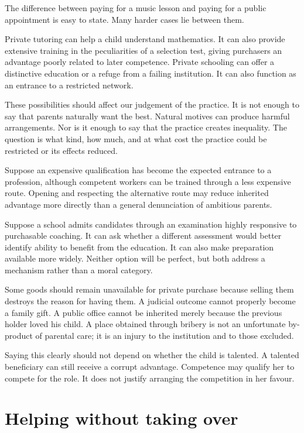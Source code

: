 \documentclass[12pt,a4paper]{book}
\begin{document}
The difference between paying for a music lesson and paying for a public appointment is easy to state. Many harder cases lie between them.

Private tutoring can help a child understand mathematics. It can also provide extensive training in the peculiarities of a selection test, giving purchasers an advantage poorly related to later competence. Private schooling can offer a distinctive education or a refuge from a failing institution. It can also function as an entrance to a restricted network.

These possibilities should affect our judgement of the practice. It is not enough to say that parents naturally want the best. Natural motives can produce harmful arrangements. Nor is it enough to say that the practice creates inequality. The question is what kind, how much, and at what cost the practice could be restricted or its effects reduced.

Suppose an expensive qualification has become the expected entrance to a profession, although competent workers can be trained through a less expensive route. Opening and respecting the alternative route may reduce inherited advantage more directly than a general denunciation of ambitious parents.

Suppose a school admits candidates through an examination highly responsive to purchasable coaching. It can ask whether a different assessment would better identify ability to benefit from the education. It can also make preparation available more widely. Neither option will be perfect, but both address a mechanism rather than a moral category.

Some goods should remain unavailable for private purchase because selling them destroys the reason for having them. A judicial outcome cannot properly become a family gift. A public office cannot be inherited merely because the previous holder loved his child. A place obtained through bribery is not an unfortunate by-product of parental care; it is an injury to the institution and to those excluded.

Saying this clearly should not depend on whether the child is talented. A talented beneficiary can still receive a corrupt advantage. Competence may qualify her to compete for the role. It does not justify arranging the competition in her favour.

\section*{Helping without taking over}
\end{document}
